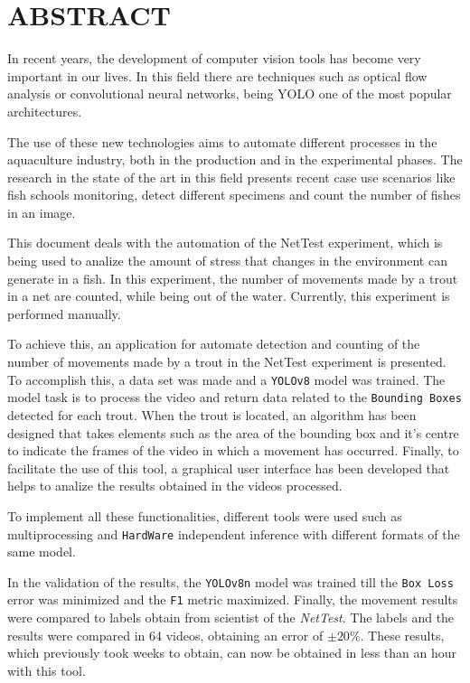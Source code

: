 \section*{ABSTRACT}
\thispagestyle{abstract}
In recent years, the development of computer vision tools has become very important in our lives. In this field there are techniques such as optical flow analysis or 
convolutional neural networks, being YOLO one of the most popular architectures.

The use of these new technologies aims to automate different processes in the aquaculture industry, both in the production and in the experimental phases. The research in the 
state of the art in this field presents recent case use scenarios like fish schools monitoring, detect different specimens and count the number of fishes in an image.

This document deals with the automation of the NetTest experiment, which is being used to analize the amount of stress that changes in the environment can generate in a fish. 
In this experiment, the number of movements made by a trout in a net are counted, while being out of the water. Currently, this experiment is performed manually.

To achieve this, an application for automate detection and counting of the number of movements made by a trout in the NetTest experiment is presented. To accomplish this, 
a data set was made and a \texttt{YOLOv8} model was trained. The model task is to process the video and return data related to the \texttt{Bounding Boxes} detected for each trout.\newline
When the trout is located, an algorithm has been designed that takes elements such as the area of the bounding box and it's centre to indicate the frames of the video in which a 
movement has occurred. Finally, to facilitate the use of this tool, a graphical user interface has been developed that helps to analize the results obtained in the videos processed.

To implement all these functionalities, different tools were used such as multiprocessing and \texttt{HardWare} independent inference with different formats of the same model.

In the validation of the results, the \texttt{YOLOv8n} model was trained till the \texttt{Box Loss} error was minimized and the \texttt{F1} metric maximized. Finally, 
the movement results were compared to labels obtain from scientist of the \textit{NetTest}. The labels and the results were compared in 64 videos, obtaining an error 
of \texttt{$ \pm 20\% $}. These results, which previously took weeks to obtain, can now be obtained in less than an hour with this tool.